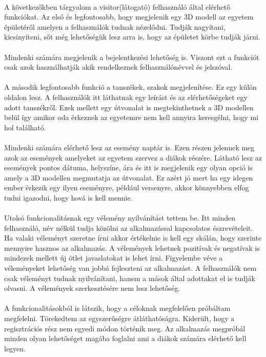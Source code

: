 	\paragraph{}
	A következőkben tárgyalom a visitor(látogató) felhasználó által elérhető funkciókat. Az első és legfontosabb, hogy megjelenik egy 3D modell az egyetem épületéről amelyen a felhasználók tudnak nézelődni. Tudják nagyítani, kicsinyíteni, sőt még lehetőségük lesz arra is, hogy az épületet körbe tudják járni. 
	\paragraph{}
	Mindenki számára megjelenik a bejelentkezési lehetőség is. Viszont ezt a funkciót csak azok használhatják akik rendelkeznek felhasználónévvel és jelszóval.
	\paragraph{}
	A második legfontosabb funkció a tanszékek, szakok megjelenítése. Ez egy külön oldalon lesz. A felhasználók itt láthatnak egy leírást és az elérhetőségeket egy adott tanszékről. Ezek mellett egy útvonalat is megtekinthetnek a 3D modellen belül így amikor oda érkeznek az egyetemre nem kell annyira keresgélni, hogy mi hol található. 
	\paragraph{}
	Mindenki számára elérhető lesz az esemény naptár is. Ezen részen jelennek meg azok az események amelyeket az egyetem szervez a diákok részére. Látható lesz az események pontos dátuma, helyszíne, ára és itt is megjelenik egy olyan opció is amely a 3D modellen megmutatja az útvonalat. Ez azért jó mert ha egy idegen ember érkezik egy ilyen eseményre, például versenyre, akkor könnyebben elfog tudni igazodni, hogy hová is kell mennie.
	\paragraph{}
	Utolsó funkcionalitásnak egy vélemény nyilvánítást tettem be. 
	Itt minden felhasználó, név nélkül tudja közölni az alkalmazással kapcsolatos észrevételeit. Ha valaki véleményt szeretne írni akkor értékelnie is kell egy skálán, hogy szerinte mennyire hasznos az alkalmazás. A vélemények lehetnek pozitívak és negatívak is mindezek mellett új ötlet javaslatokat is lehet írni. Figyelembe véve a véleményeket lehetőség van jobbá fejleszteni az alkalmazást. A felhasználók nem csak véleményt tudnak nyilvánítani, hanem a mások által adottakat el is tudják olvasni. A vélemények szerkesztésére nem lesz lehetőség.
	\paragraph{}
	A funkcionalitásokból is látszik, hogy a céloknak megfelelően próbáltam megfelelni. Törekedtem az egyszerűségre átláthatóságra. Kiderült, hogy a regisztrációs rész nem egyedi módon történik meg. Az alkalmazás megpróbál minden olyan lehetőséget magába foglalni ami a diákok számára elérhető kell legyen.